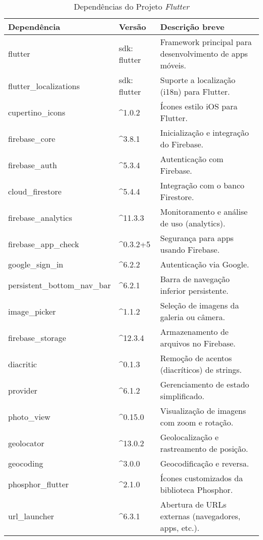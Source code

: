 \begin{table}[H]
    \centering
    \caption{Dependências do Projeto \textit{Flutter}}
    \begin{tabular}{|p{4cm}|p{2.5cm}|p{8cm}|}
    \hline
    \textbf{Dependência} & \textbf{Versão} & \textbf{Descrição breve} \\ \hline
    flutter & sdk: flutter & Framework principal para desenvolvimento de apps móveis. \\ \hline
    flutter\_localizations & sdk: flutter & Suporte a localização (i18n) para Flutter. \\ \hline
    cupertino\_icons & \^{}1.0.2 & Ícones estilo iOS para Flutter. \\ \hline
    firebase\_core & \^{}3.8.1 & Inicialização e integração do Firebase. \\ \hline
    firebase\_auth & \^{}5.3.4 & Autenticação com Firebase. \\ \hline
    cloud\_firestore & \^{}5.4.4 & Integração com o banco Firestore. \\ \hline
    firebase\_analytics & \^{}11.3.3 & Monitoramento e análise de uso (analytics). \\ \hline
    firebase\_app\_check & \^{}0.3.2+5 & Segurança para apps usando Firebase. \\ \hline
    google\_sign\_in & \^{}6.2.2 & Autenticação via Google. \\ \hline
    persistent\_bottom\_nav\_bar & \^{}6.2.1 & Barra de navegação inferior persistente. \\ \hline
    image\_picker & \^{}1.1.2 & Seleção de imagens da galeria ou câmera. \\ \hline
    firebase\_storage & \^{}12.3.4 & Armazenamento de arquivos no Firebase. \\ \hline
    diacritic & \^{}0.1.3 & Remoção de acentos (diacríticos) de strings. \\ \hline
    provider & \^{}6.1.2 & Gerenciamento de estado simplificado. \\ \hline
    photo\_view & \^{}0.15.0 & Visualização de imagens com zoom e rotação. \\ \hline
    geolocator & \^{}13.0.2 & Geolocalização e rastreamento de posição. \\ \hline
    geocoding & \^{}3.0.0 & Geocodificação e reversa. \\ \hline
    phosphor\_flutter & \^{}2.1.0 & Ícones customizados da biblioteca Phosphor. \\ \hline
    url\_launcher & \^{}6.3.1 & Abertura de URLs externas (navegadores, apps, etc.). \\ \hline

\end{tabular}
\end{table}
